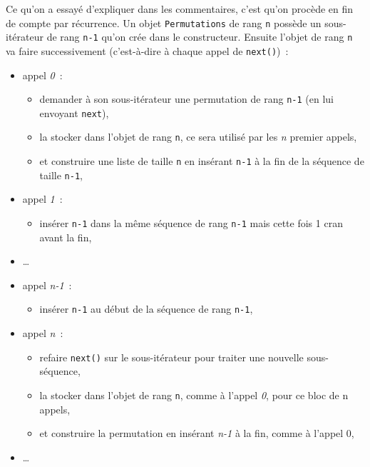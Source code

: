     Ce qu'on a essayé d'expliquer dans les commentaires, c'est qu'on procède
en fin de compte par récurrence. Un objet \texttt{Permutations} de rang
\texttt{n} possède un sous-itérateur de rang \texttt{n-1} qu'on crée
dans le constructeur. Ensuite l'objet de rang \texttt{n} va faire
successivement (c'est-à-dire à chaque appel de \texttt{next()})~:

\begin{itemize}
\item
  appel \emph{0}~:

  \begin{itemize}
  \tightlist
  \item
    demander à son sous-itérateur une permutation de rang \texttt{n-1}
    (en lui envoyant \texttt{next}),
  \item
    la stocker dans l'objet de rang \texttt{n}, ce sera utilisé par les
    \emph{n} premier appels,
  \item
    et construire une liste de taille \texttt{n} en insérant
    \texttt{n-1} à la fin de la séquence de taille \texttt{n-1},
  \end{itemize}
\item
  appel \emph{1}~:

  \begin{itemize}
  \tightlist
  \item
    insérer \texttt{n-1} dans la même séquence de rang \texttt{n-1} mais
    cette fois 1 cran avant la fin,
  \end{itemize}
\item
  \ldots{}
\item
  appel \emph{n-1}~:

  \begin{itemize}
  \tightlist
  \item
    insérer \texttt{n-1} au début de la séquence de rang \texttt{n-1},
  \end{itemize}
\item
  appel \emph{n}~:

  \begin{itemize}
  \tightlist
  \item
    refaire \texttt{next()} sur le sous-itérateur pour traiter une
    nouvelle sous-séquence,
  \item
    la stocker dans l'objet de rang \texttt{n}, comme à l'appel
    \emph{0}, pour ce bloc de n appels,
  \item
    et construire la permutation en insérant \emph{n-1} à la fin, comme
    à l'appel 0,
  \end{itemize}
\item
  \ldots{}
\end{itemize}


